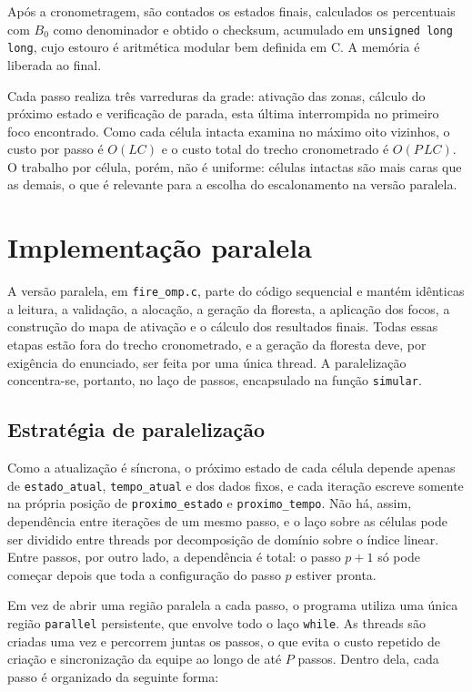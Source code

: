 \documentclass[12pt,a4paper]{article}
\begin{document}
Após a cronometragem, são contados os estados finais, calculados os
percentuais com $B_0$ como denominador e obtido o checksum, acumulado em
\texttt{unsigned long long}, cujo estouro é aritmética modular bem
definida em C. A memória é liberada ao final.

Cada passo realiza três varreduras da grade: ativação das zonas, cálculo
do próximo estado e verificação de parada, esta última interrompida no
primeiro foco encontrado. Como cada célula intacta examina no máximo
oito vizinhos, o custo por passo é $O(LC)$ e o custo total do trecho
cronometrado é $O(P\,LC)$. O trabalho por célula, porém, não é uniforme:
células intactas são mais caras que as demais, o que é relevante para a
escolha do escalonamento na versão paralela.

\section{Implementação paralela}

A versão paralela, em \texttt{fire\_omp.c}, parte do código sequencial e
mantém idênticas a leitura, a validação, a alocação, a geração da
floresta, a aplicação dos focos, a construção do mapa de ativação e o
cálculo dos resultados finais. Todas essas etapas estão fora do trecho
cronometrado, e a geração da floresta deve, por exigência do enunciado,
ser feita por uma única thread. A paralelização concentra-se, portanto,
no laço de passos, encapsulado na função \texttt{simular}.

\subsection{Estratégia de paralelização}

Como a atualização é síncrona, o próximo estado de cada célula depende
apenas de \texttt{estado\_atual}, \texttt{tempo\_atual} e dos dados fixos,
e cada iteração escreve somente na própria posição de
\texttt{proximo\_estado} e \texttt{proximo\_tempo}. Não há, assim,
dependência entre iterações de um mesmo passo, e o laço sobre as células
pode ser dividido entre threads por decomposição de domínio sobre o
índice linear. Entre passos, por outro lado, a dependência é total: o
passo $p+1$ só pode começar depois que toda a configuração do passo $p$
estiver pronta.

Em vez de abrir uma região paralela a cada passo, o programa utiliza uma
única região \texttt{parallel} persistente, que envolve todo o laço
\texttt{while}. As threads são criadas uma vez e percorrem juntas os
passos, o que evita o custo repetido de criação e sincronização da
equipe ao longo de até $P$ passos. Dentro dela, cada passo é organizado
da seguinte forma:
\end{document}
